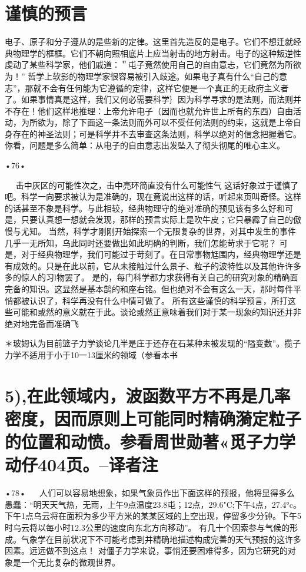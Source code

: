 \section{谨慎的预言}

电子、原子和分子遵从的是些新的定律。这里首先造反的是电子。它们不想迁就经典物理学的框框。它们不朝向照相底片上应当射击的地方射击。电子的这种叛逆性虔动了某些科学家，他们戚道：＂屯子竟然使用自己的自由意忐，它们竟然为所欲为！”
哲学上软影的物理学家很容易被引入歧途。如果电子真有什么“自己的意志”，那就不会有任何能为它遵循的定律，这样它便是一个真正的无政府主义者了。如果事情真是这样，我们又何必需要科学｝因为科学寻求的是法则，而法则并不存在！他们这样地推理：上帝允许电子（因而也就允许世上所有的东西）自由活动，为所欲为，除了下面这一条法则而外可以不受任何法则的约束，这就是上帝自身存在的神圣法则；可是科学并不去审查这条法则，科学以绝对的信念把握着它。你看，问题是多么简单：从电子的自由意志出发坠入了彻头彻尾的唯心主义。

•76•
  



  
击中灰区的可能性次之，击中亮环简直没有什么可能性气
这话好象过于谨慎了吧。科学一向要求被认为是准确的，现在竟说出这样的话，听起来页叫奇怪。这样的话甚至不象是科学。与此相较，经典物理守的绝对准确的预见该有多么好和可是，只要认真想一想就会发现，那样的预言实际上是吹牛皮；它只暴霹了自己的傲慢与尤知。
当然，科学才刚刚开始探索一个无限复杂的世界，对其中发生的事件几乎一无所知，乌此同时还要做出如此明确的判断，我们怎能苛求于它呢？
可是，对于经典物理学，我们可能过于苛刻了。在日常事物尪围内，经典物理学还是有成效的。只是在此以前，它从未接触过什么景子、粒子的波特性以及其他许许多多的惊人的习l物罢了。
是的，每门科学都力求获得有关自己的研究对象的精确面完备的知识。这显然是基本鹄的和座右铭。但也绝对不会有这么一天，那时每件平悄都被认识了，科学再没有什么中情可做了。
所有这些谨慎的科学预言，所打这些可能和或然的意义就在于此。谈论或然正意味着我们对于某一现象的知识还并非绝对地完备而准确飞

＊玻姆认为目前篮子力学谈论几半是庄于还存在石某种未被发现的“隘变数”。揽子力学不适用于小于10一13厘米的领域（参看本书\section{5),在此领域内，波函数平方不再是几率密度，因而原则上可能同时精确漪定粒子的位置和动愤。参看周世勋著«觅子力学动仔404页。--译者注}

•78•
  
人们可以容易地想象，如果气象员作出下面这样的预报，他将显得多么愚蠢：“明天天气热，无雨，上午9点温度23.8屯；12点，29.6"C;下午4点，27.4°c。下午1点乌云将在面积为多少平方米的某某区域的上空出现，停留多少分钟。下午5时乌云将以每小时12.3公里的速度向东北方向移动”。
有几十个因索参与气候的形成。气象学在目前状况下不可能考虑到并精确地描述构成完善的天气预报的这许多因素。远远做不到这点！
对僵子力学来说，事悄还要困难得多，因为它研究的对象是一个无比复杂的微观世界。

